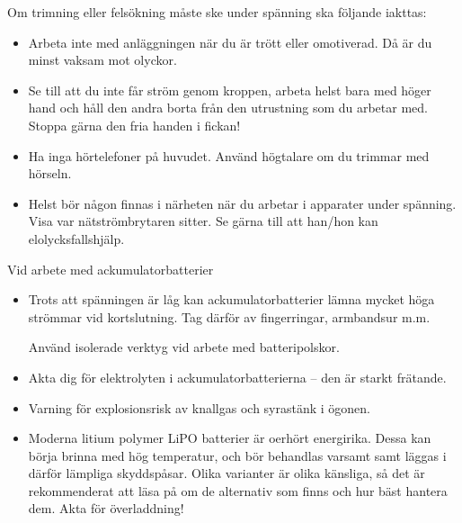 Om trimning eller felsökning måste ske under spänning ska följande iakttas:
\begin{itemize}
\item Arbeta inte med anläggningen när du är trött eller
  omotiverad. Då är du minst vaksam mot olyckor.
\item Se till att du inte får ström genom kroppen, arbeta helst bara med
  höger hand och håll den andra borta från den utrustning som du
  arbetar med. Stoppa gärna den fria handen i fickan!
\item Ha inga hörtelefoner på huvudet. Använd högtalare om du trimmar
  med hörseln.
\item Helst bör någon finnas i närheten när du arbetar i apparater
  under spänning. Visa var nätströmbrytaren sitter. Se gärna till att
  han/hon kan elolycksfallshjälp.
\end{itemize}

Vid arbete med ackumulatorbatterier
\begin{itemize}
\item Trots att spänningen är låg kan ackumulatorbatterier lämna
  mycket höga strömmar vid kortslutning. Tag därför av fingerringar,
  armbandsur m.m.

Använd isolerade verktyg vid arbete med batteripolskor.
\item Akta dig för elektrolyten i ackumulatorbatterierna -- den är
  starkt frätande.
\item Varning för explosionsrisk av knallgas och syrastänk i ögonen.
\item Moderna litium polymer LiPO batterier är oerhört energirika.
  Dessa kan börja brinna med hög temperatur, och bör behandlas varsamt samt
  läggas i därför lämpliga skyddspåsar.
  Olika varianter är olika känsliga, så det är rekommenderat att läsa på om
  de alternativ som finns och hur bäst hantera dem.
  Akta för överladdning!
\end{itemize}
